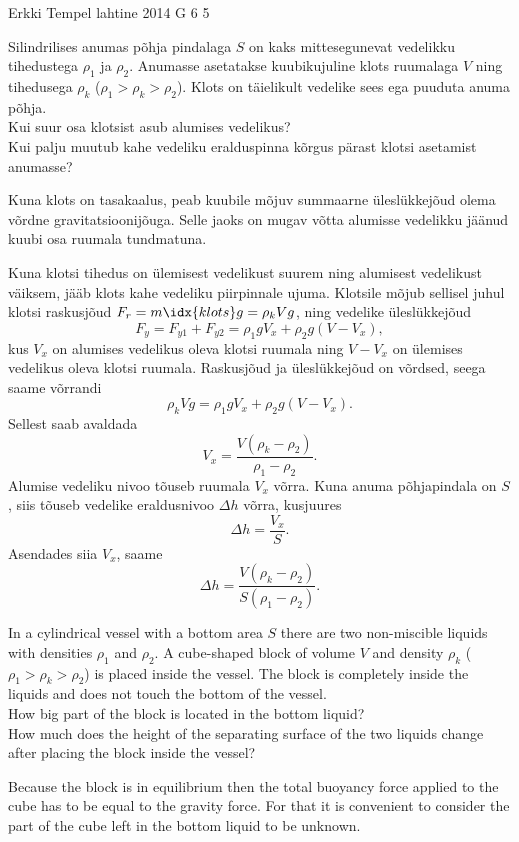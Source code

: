 {Erkki Tempel} %
{lahtine} %
{2014} %
{G 6} %
{5} %
{
\ifStatement
Silindrilises anumas põhja pindalaga $S$ on kaks mittesegunevat vedelikku tihedustega $\rho_1$ ja $\rho_2$. Anumasse asetatakse kuubikujuline klots ruumalaga $V$ ning tihedusega $\rho_k$ ($\rho_1>\rho_k>\rho_2$). Klots on täielikult vedelike sees ega puuduta anuma põhja.\\
\osa Kui suur osa klotsist asub alumises vedelikus?\\
\osa Kui palju muutub kahe vedeliku eralduspinna kõrgus pärast klotsi asetamist anumasse?
\fi


\ifHint
Kuna klots on tasakaalus, peab kuubile mõjuv summaarne üleslükkejõud olema võrdne gravitatsioonijõuga. Selle jaoks on mugav võtta alumisse vedelikku jäänud kuubi osa ruumala tundmatuna.
\fi


\ifSolution
Kuna klotsi tihedus on ülemisest vedelikust suurem ning alumisest vedelikust väiksem, jääb klots kahe vedeliku piirpinnale ujuma. Klotsile mõjub sellisel juhul klotsi raskusjõud $F_r = m\idx{klots}g=\rho_k Vg$, ning vedelike üleslükkejõud
\[ F_y=F_{y1}+F_{y2}=\rho_1gV_x + \rho_2g(V-V_x), \]
kus $V_x$ on alumises vedelikus oleva klotsi ruumala ning $V-V_x$ on ülemises vedelikus oleva klotsi ruumala.
Raskusjõud ja üleslükkejõud on võrdsed, seega saame võrrandi
\[ \rho_k Vg = \rho_1gV_x + \rho_2g(V-V_x). \]
Sellest saab avaldada 
\[ V_x = \frac{V(\rho_k-\rho_2)}{\rho_1-\rho_2}. \]
Alumise vedeliku nivoo tõuseb ruumala $V_x$ võrra. Kuna anuma põhjapindala on $S$, siis tõuseb vedelike eraldusnivoo $\Delta h$ võrra, kusjuures
\[ \Delta h = \frac{V_x}{S}. \]
Asendades siia $V_x$, saame
\[ \Delta h = \frac{V(\rho_k-\rho_2)}{S(\rho_1-\rho_2)}. \]
\fi


\ifEngStatement
In a cylindrical vessel with a bottom area $S$ there are two non-miscible liquids with densities $\rho_1$ and $\rho_2$. A cube-shaped block of volume $V$ and density $\rho_k$ ($\rho_1>\rho_k>\rho_2$) is placed inside the vessel. The block is completely inside the liquids and does not touch the bottom of the vessel.\\
\osa How big part of the block is located in the bottom liquid?\\
\osa How much does the height of the separating surface of the two liquids change after placing the block inside the vessel?
\fi


\ifEngHint
Because the block is in equilibrium then the total buoyancy force applied to the cube has to be equal to the gravity force. For that it is convenient to consider the part of the cube left in the bottom liquid to be unknown.
\fi


}
